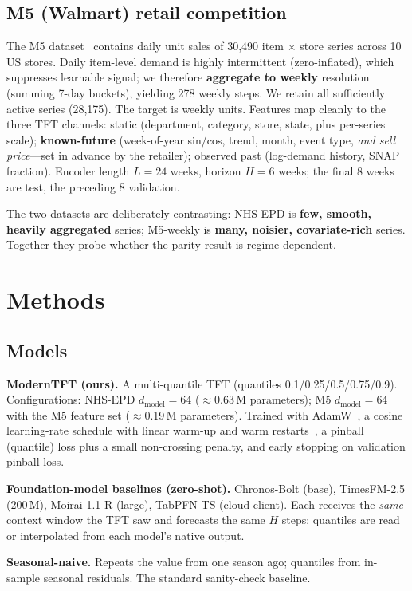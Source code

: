 \documentclass[11pt]{article}
\begin{document}
\subsection{M5 (Walmart) retail competition}
The M5 dataset~\cite{m5} contains daily unit sales of 30{,}490 item $\times$ store series
across 10 US stores. Daily item-level demand is highly intermittent (zero-inflated), which
suppresses learnable signal; we therefore \textbf{aggregate to weekly} resolution (summing
7-day buckets), yielding 278 weekly steps. We retain all sufficiently active series (28{,}175).
The target is weekly units. Features map cleanly to the three TFT channels: static
(department, category, store, state, plus per-series scale); \textbf{known-future}
(week-of-year sin/cos, trend, month, event type, \emph{and sell price}---set in advance by the
retailer); observed past (log-demand history, SNAP fraction). Encoder length $L=24$ weeks,
horizon $H=6$ weeks; the final 8 weeks are test, the preceding 8 validation.

The two datasets are deliberately contrasting: NHS-EPD is \textbf{few, smooth, heavily
aggregated} series; M5-weekly is \textbf{many, noisier, covariate-rich} series. Together they
probe whether the parity result is regime-dependent.

\section{Methods}
\subsection{Models}
\textbf{ModernTFT (ours).} A multi-quantile TFT (quantiles 0.1/0.25/0.5/0.75/0.9).
Configurations: NHS-EPD $d_{\text{model}}=64$ ($\approx$0.63\,M parameters); M5
$d_{\text{model}}=64$ with the M5 feature set ($\approx$0.19\,M parameters). Trained with
AdamW~\cite{adamw}, a cosine learning-rate schedule with linear warm-up and warm
restarts~\cite{sgdr}, a pinball (quantile) loss plus a small non-crossing penalty, and early
stopping on validation pinball loss.

\textbf{Foundation-model baselines (zero-shot).} Chronos-Bolt (base), TimesFM-2.5 (200\,M),
Moirai-1.1-R (large), TabPFN-TS (cloud client). Each receives the \emph{same} context window
the TFT saw and forecasts the same $H$ steps; quantiles are read or interpolated from each
model's native output.

\textbf{Seasonal-naive.} Repeats the value from one season ago; quantiles from in-sample
seasonal residuals. The standard sanity-check baseline.
\end{document}
